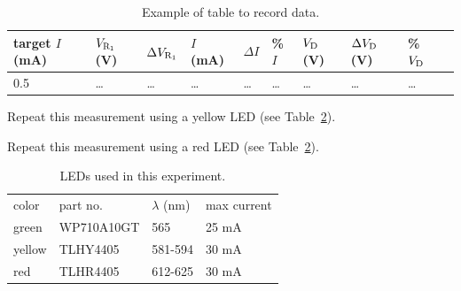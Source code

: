 \begin{table}
\begin{center}
\caption{Example of table to record data.
\label{tbl:example}
}
\begin{tabular}{llllllllll}
target $I$ (mA) & $V_{\rm R_1}$ (V) & $\Delta V_{\rm R_1}$ & $I$ (mA) & $\Delta I$ & \% $I$ &$V_{\rm D}$ (V) & $\Delta V_{\rm D}$ (V) & \% $V_{\rm D}$ \\
\hline
0.5 & \dots &  \dots &  \dots & \dots  & \dots & \dots & \dots & \dots  \\
\end{tabular}
\end{center}
\end{table}

\begin{measurement} 
Repeat this measurement using a yellow LED (see Table~\ref{tbl:led}).
\end{measurement}

\begin{measurement} 
Repeat this measurement using a red LED (see Table~\ref{tbl:led}).
\end{measurement}


\begin{table}[htbp]
\begin{center}
\caption{LEDs used in this experiment.}
\label{tbl:led}
\begin{tabular}{llll}
color & part no. & $\lambda$ (nm) & max current \\
green & WP710A10GT & 565 & 25 mA \\  
yellow & TLHY4405 & 581-594 & 30 mA \\ 
red & TLHR4405 & 612-625 & 30 mA \\ 
\end{tabular}
\end{center}
\end{table}

